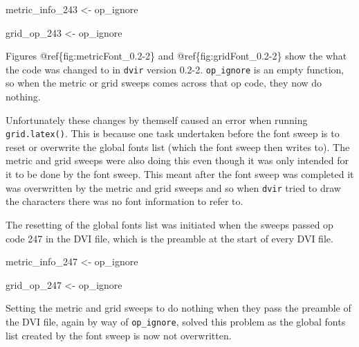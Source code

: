 \documentclass[]{article}
\newenvironment{Shaded}{\begin{snugshade}}{\end{snugshade}}
\newcommand{\DecValTok}[1]{\textcolor[rgb]{0.00,0.00,0.81}{#1}}
\newcommand{\StringTok}[1]{\textcolor[rgb]{0.31,0.60,0.02}{#1}}
\newcommand{\NormalTok}[1]{#1}
\begin{document}
\begin{Shaded}
\begin{Highlighting}[]
\NormalTok{metric_info_}\DecValTok{243}\NormalTok{ <-}\StringTok{ }\NormalTok{op_ignore}
\end{Highlighting}
\end{Shaded}

\begin{Shaded}
\begin{Highlighting}[]
\NormalTok{grid_op_}\DecValTok{243}\NormalTok{ <-}\StringTok{ }\NormalTok{op_ignore}
\end{Highlighting}
\end{Shaded}

Figures @ref\{fig:metricFont\_0.2-2\} and @ref\{fig:gridFont\_0.2-2\}
show the what the code was changed to in \texttt{dvir} version 0.2-2.
\texttt{op\_ignore} is an empty function, so when the metric or grid
sweeps comes across that op code, they now do nothing.

Unfortunately these changes by themself caused an error when running
\texttt{grid.latex()}. This is because one task undertaken before the
font sweep is to reset or overwrite the global fonts list (which the
font sweep then writes to). The metric and grid sweeps were also doing
this even though it was only intended for it to be done by the font
sweep. This meant after the font sweep was completed it was overwritten
by the metric and grid sweeps and so when \texttt{dvir} tried to draw
the characters there was no font information to refer to.

The resetting of the global fonts list was initiated when the sweeps
passed op code 247 in the DVI file, which is the preamble at the start
of every DVI file.

\begin{Shaded}
\begin{Highlighting}[]
\NormalTok{metric_info_}\DecValTok{247}\NormalTok{ <-}\StringTok{ }\NormalTok{op_ignore}
\end{Highlighting}
\end{Shaded}

\begin{Shaded}
\begin{Highlighting}[]
\NormalTok{grid_op_}\DecValTok{247}\NormalTok{ <-}\StringTok{ }\NormalTok{op_ignore}
\end{Highlighting}
\end{Shaded}

Setting the metric and grid sweeps to do nothing when they pass the
preamble of the DVI file, again by way of \texttt{op\_ignore}, solved
this problem as the global fonts list created by the font sweep is now
not overwritten.
\end{document}
